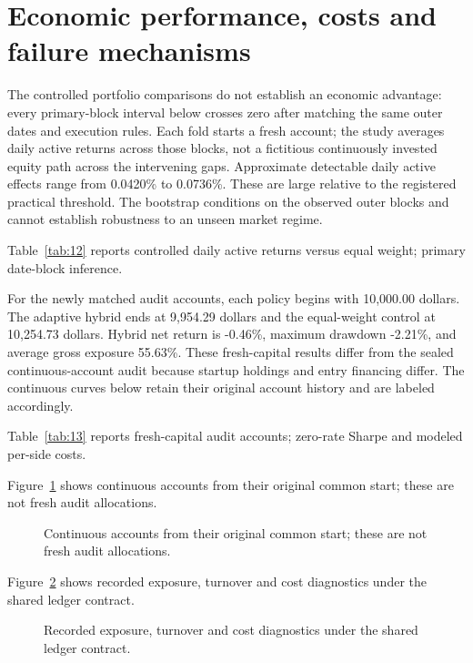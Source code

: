 \section{Economic performance, costs and failure mechanisms}\label{sec:section-08}

The controlled portfolio comparisons do not establish an economic advantage: every primary-block interval below crosses zero after matching the same outer dates and execution rules. Each fold starts a fresh account; the study averages daily active returns across those blocks, not a fictitious continuously invested equity path across the intervening gaps. Approximate detectable daily active effects range from 0.0420\% to 0.0736\%. These are large relative to the registered practical threshold. The bootstrap conditions on the observed outer blocks and cannot establish robustness to an unseen market regime.

\noindent Table~\ref{tab:12} reports controlled daily active returns versus equal weight; primary date-block inference.



For the newly matched audit accounts, each policy begins with 10,000.00 dollars. The adaptive hybrid ends at 9,954.29 dollars and the equal-weight control at 10,254.73 dollars. Hybrid net return is -0.46\%, maximum drawdown -2.21\%, and average gross exposure 55.63\%. These fresh-capital results differ from the sealed continuous-account audit because startup holdings and entry financing differ. The continuous curves below retain their original account history and are labeled accordingly.

\noindent Table~\ref{tab:13} reports fresh-capital audit accounts; zero-rate Sharpe and modeled per-side costs.



\noindent Figure~\ref{fig:10} shows continuous accounts from their original common start; these are not fresh audit allocations.

\begin{figure}[htbp]\centering

\caption{Continuous accounts from their original common start; these are not fresh audit allocations.}\label{fig:10}
\end{figure}

\noindent Figure~\ref{fig:11} shows recorded exposure, turnover and cost diagnostics under the shared ledger contract.

\begin{figure}[htbp]\centering

\caption{Recorded exposure, turnover and cost diagnostics under the shared ledger contract.}\label{fig:11}
\end{figure}

